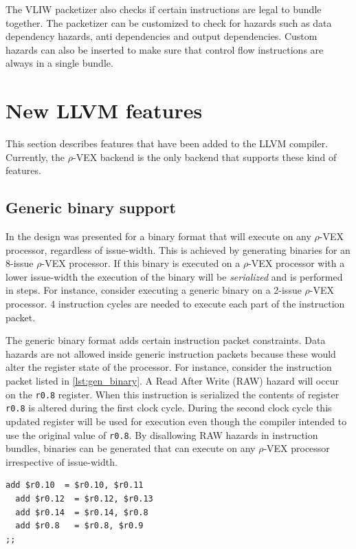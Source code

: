 The VLIW packetizer also checks if certain instructions are legal to bundle together. The packetizer can be customized to check for hazards such as data dependency hazards, anti dependencies and output dependencies. Custom hazards can also be inserted to make sure that control flow instructions are always in a single bundle.

\section{New LLVM features}
This section describes features that have been added to the LLVM compiler. Currently, the $\rho$-VEX backend is the only backend that supports these kind of features.

\subsection{Generic binary support}

In \cite{Anthony-Brandon:2013jk} the design was presented for a binary format that will execute on any $\rho$-VEX processor, regardless of issue-width. This is achieved by generating binaries for an 8-issue $\rho$-VEX processor. If this binary is executed on a $\rho$-VEX processor with a lower issue-width the execution of the binary will be \emph{serialized} and is performed in steps. For instance, consider executing a generic binary on a 2-issue $\rho$-VEX processor. 4 instruction cycles are needed to execute each part of the instruction packet.


The generic binary format adds certain instruction packet constraints. Data hazards are not allowed inside generic instruction packets because these would alter the register state of the processor. For instance, consider the instruction packet listed in \ref{lst:gen_binary}. A Read After Write (RAW) hazard will occur on the \texttt{r0.8} register. When this instruction is serialized the contents of register \texttt{r0.8} is altered during the first clock cycle. During the second clock cycle this updated register will be used for execution even though the compiler intended to use the original value of \texttt{r0.8}. By disallowing RAW hazards in instruction bundles, binaries can be generated that can execute on any $\rho$-VEX processor irrespective of issue-width.

\begin{lstlisting}[language=rvex, label=lst:gen_binary, caption={Regular $\rho$-VEX binary.}]
  add $r0.10  = $r0.10, $r0.11
  add $r0.12  = $r0.12, $r0.13
  add $r0.14  = $r0.14, $r0.8
  add $r0.8   = $r0.8, $r0.9
;; 
\end{lstlisting}

